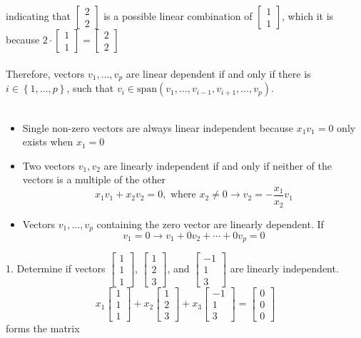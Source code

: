 indicating that $\begin{bmatrix} 2 \\ 2 \end{bmatrix}$ is a possible linear combination of 
$\begin{bmatrix} 1 \\ 1 \end{bmatrix}$, which it is because $2 \cdot 
\begin{bmatrix} 1 \\ 1 \end{bmatrix} = \begin{bmatrix} 2 \\ 2 \end{bmatrix}$ \\\\
Therefore, vectors $v_1, \dots, v_p$ are linear dependent if and only if there is 
$i \in \left\{1, \dots, p\right\}$, such that $v_i \in \text{span}(v_1, \dots, v_{i - 1}, 
v_{i + 1}, \dots, v_p)$. \\\\
\begin{itemize}
  \item Single non-zero vectors are always linear independent because $x_1v_1 = 0$ only exists 
when $x_1 = 0$ 
  \item Two vectors $v_1, v_2$ are linearly independent if and only if neither of the vectors 
    is a multiple of the other 
    \[
      x_1v_1 + x_2v_2 = 0, \text{ where } x_2 \neq 0 \rightarrow v_2 = -\frac{x_1}{x_2}v_1 
    \]
  \item Vectors $v_1, \dots, v_p$ containing the zero vector are linearly dependent. If
    \[
      v_1 = 0 \rightarrow v_1 + 0v_2 + \cdots + 0v_p = 0
    \]
\end{itemize}
1. Determine if vectors $\begin{bmatrix} 1 \\ 1 \\ 1 \end{bmatrix}$, 
$\begin{bmatrix} 1 \\ 2 \\ 3 \end{bmatrix}$, and 
$\begin{bmatrix} -1 \\ 1 \\ 3 \end{bmatrix}$ are linearly independent. 
\[
  x_1\begin{bmatrix} 1\\1\\1\end{bmatrix} + x_2 \begin{bmatrix}1 \\ 2 \\ 3\end{bmatrix} 
  + x_3\begin{bmatrix}-1 \\ 1\\ 3\end{bmatrix} = \begin{bmatrix} 0 \\ 0 \\ 0 
  \end{bmatrix}
\] forms the matrix 
